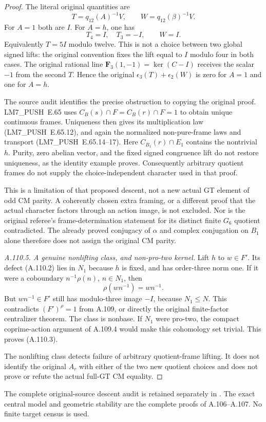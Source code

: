 \begin{proof}
The literal original quantities are
\[
 T=q_{12}(A)^{-1}V,\qquad W=q_{12}(\beta)^{-1}V.
 \tag{A.110.9}
\]
For \(A=1\) both are \(I\). For \(A=h\), one has
\[
 T_4=I,\quad T_3=-I,\qquad W=I.
 \]
Equivalently \(T=5I\) modulo twelve. This is not a choice between
two global signed lifts: the original convention fixes the lift
equal to \(I\) modulo four in both cases.
The original rational line
\(\mathbf F_3(1,-1)=\ker(C-I)\) receives the scalar \(-1\) from
the second \(T\). Hence the original
\(\epsilon_3(T)+\epsilon_2(W)\) is zero for \(A=1\) and one for
\(A=h\).

The source audit identifies the precise obstruction to copying
the original proof. LM7\_PUSH~E.65 uses
\(C_B(s)\cap F=C_B(r)\cap F=1\) to obtain unique continuous frames.
Uniqueness then gives its multiplication law (LM7\_PUSH~E.65.12), and again
the normalized non-pure-frame laws and transport (LM7\_PUSH~E.65.14--17).
Here \(C_{B_1}(r)\cap E_1\) contains the nontrivial \(h\).
Purity, zero abelian vector, and the fixed signed congruence lift
do not restore uniqueness, as the identity example proves.
Consequently arbitrary quotient frames do not supply the
choice-independent character used in that proof.

This is a limitation of that proposed descent, not a new actual
GT element of odd CM parity. A coherently chosen extra framing,
or a different proof that the actual character factors through
an action image, is not excluded. Nor is the original referee's
frame-determination statement for its distinct finite \(G_6\)
quotient contradicted. The already proved conjugacy of
\(\alpha\) and complex conjugation on \(B_1\) alone therefore
does not assign the original CM parity.

\emph{A.110.5. A genuine nonlifting class, and non-pro-two kernel.}
Lift \(h\) to \(w\in F'\). Its defect (A.110.2) lies in \(N_1\)
because \(h\) is fixed, and has order-three norm one.
If it were a coboundary \(n^{-1}\rho(n)\), \(n\in N_1\), then
\[
 \rho(wn^{-1})=wn^{-1}.
 \]
But \(wn^{-1}\in F'\) still has modulo-three image \(-I\), because
\(N_1\le N\). This contradicts \((F')^\rho=1\) from A.109,
or directly the original finite-factor centralizer theorem.
The class is nonbase. If \(N_1\) were pro-two, the compact
coprime-action argument of A.109.4 would make this cohomology
set trivial. This proves (A.110.3).

The nonlifting class detects failure of arbitrary quotient-frame
lifting. It does not identify the original \(A_r\) with either
of the two new quotient choices and does not prove or refute the
actual full-GT CM equality.
\end{proof}

The complete original-source descent audit is retained separately in
.
The exact central model and geometric stability are the complete
proofs of A.106--A.107. No finite target census is used.

